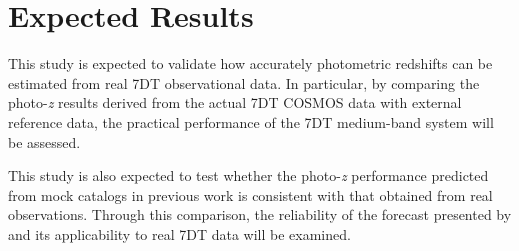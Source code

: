 \documentclass[11pt]{article}
\begin{document}
\section{Expected Results}

This study is expected to validate how accurately photometric redshifts can be estimated from real 7DT observational data. In particular, by comparing the photo-\textit{z} results derived from the actual 7DT COSMOS data with external reference data, the practical performance of the 7DT medium-band system will be assessed.

This study is also expected to test whether the photo-\textit{z} performance predicted from mock catalogs in previous work is consistent with that obtained from real observations. Through this comparison, the reliability of the forecast presented by \citet{Ko2025} and its applicability to real 7DT data will be examined.




\end{document}
